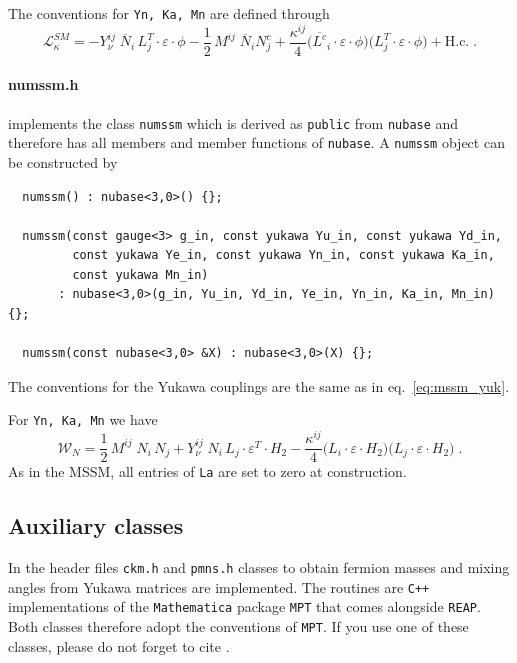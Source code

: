 \documentclass[11pt,a4paper]{article}
\begin{document}
The conventions for \texttt{Yn, Ka, Mn} are defined through
\begin{equation}\label{eq:sm_nu}
  \mathcal{L}_{\kappa}^{SM} = - Y_\nu^{ij}\; \overline{N}_i\, L_j^T \cdot \varepsilon \cdot \phi -\frac{1}{2}\, M^{ij}\; \overline{N}_i N^c_j  + \frac{\kappa^{ij}}{4} \bigl(\overline{L^c}_i\cdot \varepsilon \cdot \phi \bigr) \bigl(L_j^T\cdot \varepsilon \cdot \phi \bigr) + \mathrm{H.c.} \;.
\end{equation}

\paragraph{numssm.h}
implements the class \texttt{numssm} which is derived as \texttt{public} from \texttt{nubase} and therefore has all members and member functions of \texttt{nubase}. A \texttt{numssm} object can be constructed by
\begin{lstlisting}
  numssm() : nubase<3,0>() {};
  
  numssm(const gauge<3> g_in, const yukawa Yu_in, const yukawa Yd_in,
         const yukawa Ye_in, const yukawa Yn_in, const yukawa Ka_in,
         const yukawa Mn_in)
       : nubase<3,0>(g_in, Yu_in, Yd_in, Ye_in, Yn_in, Ka_in, Mn_in) {};
  
  numssm(const nubase<3,0> &X) : nubase<3,0>(X) {};
\end{lstlisting}
The conventions for the Yukawa couplings are the same as in eq.~\eqref{eq:mssm_yuk}.

For \texttt{Yn, Ka, Mn} we have
\begin{equation} \label{eq:mssm_nu}
    \mathcal{W}_{N} = \frac{1}{2}\, M^{ij}\; N_i\, N_j + Y_\nu^{ij}\; N_i\, L_j \cdot \varepsilon^T \cdot H_2 -\frac{\kappa^{ij}}{4} \bigl(L_i\cdot \varepsilon \cdot H_2\bigr) \bigl(L_j\cdot \varepsilon \cdot H_2\bigr)\;.
\end{equation}
As in the MSSM, all entries of \texttt{La} are set to zero at construction.

\subsection{\label{sec::auxiliary} Auxiliary classes}
In the header files \texttt{ckm.h} and \texttt{pmns.h} classes to obtain fermion masses and mixing angles from Yukawa matrices are implemented. The routines are \texttt{C++} implementations of the \texttt{Mathematica} package \texttt{MPT} that comes alongside \texttt{REAP}. Both classes therefore adopt the conventions of \texttt{MPT}. If you use one of these classes, please do not forget to cite \cite{Antusch:2005gp}.
\end{document}
